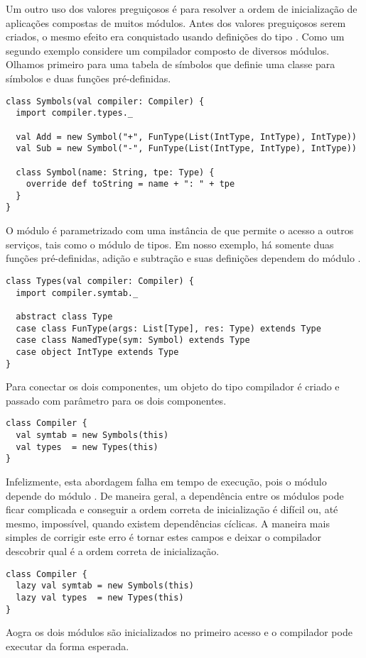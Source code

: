 Um outro uso dos valores preguiçosos é para resolver a ordem de inicialização
de aplicações compostas de muitos módulos. Antes dos valores preguiçosos serem
criados, o mesmo efeito era conquistado usando definições do tipo \lstinline@object@. 
Como um segundo exemplo considere um compilador composto de diversos módulos. Olhamos
primeiro para uma tabela de símbolos que definie uma classe para símbolos e duas funções pré-definidas.
\begin{lstlisting}
class Symbols(val compiler: Compiler) {
  import compiler.types._

  val Add = new Symbol("+", FunType(List(IntType, IntType), IntType))
  val Sub = new Symbol("-", FunType(List(IntType, IntType), IntType))

  class Symbol(name: String, tpe: Type) {
    override def toString = name + ": " + tpe
  }
}
\end{lstlisting}
O módulo  \lstinline@Symbols@ é parametrizado com uma instância de  \lstinline@Compiler@
que permite o acesso a outros serviços, tais como o módulo de tipos. Em nosso exemplo, há somente
duas funções pré-definidas, adição e subtração e suas definições dependem do módulo \lstinline@types@.
\begin{lstlisting}
class Types(val compiler: Compiler) {
  import compiler.symtab._

  abstract class Type
  case class FunType(args: List[Type], res: Type) extends Type
  case class NamedType(sym: Symbol) extends Type
  case object IntType extends Type
}
\end{lstlisting}
Para conectar os dois componentes, um objeto do tipo compilador é criado e passado com parâmetro para os
dois componentes.
\begin{lstlisting}
class Compiler {
  val symtab = new Symbols(this)
  val types  = new Types(this)
}
\end{lstlisting}
Infelizmente, esta abordagem falha em tempo de execução, pois o módulo 
\lstinline@symtab@ depende do módulo  \lstinline@types@. De maneira geral,
a dependência entre os módulos pode ficar complicada e conseguir a ordem correta
de inicialização é difícil ou, até mesmo, impossível, quando existem dependências cíclicas.
A maneira mais simples de corrigir este erro é tornar estes campos 
\lstinline@lazy@ e deixar o compilador descobrir qual é a ordem correta de inicialização.
\begin{lstlisting}
class Compiler {
  lazy val symtab = new Symbols(this)
  lazy val types  = new Types(this)
}
\end{lstlisting}
Aogra os dois módulos são inicializados no primeiro acesso e o compilador pode executar da forma
esperada.

